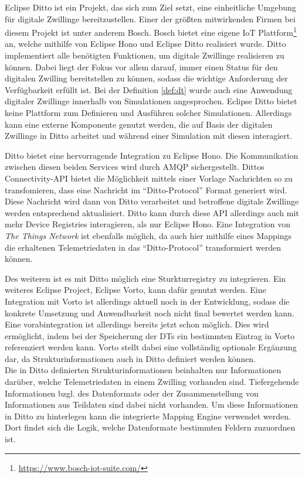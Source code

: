 Eclipse Ditto ist ein Projekt, das sich zum Ziel setzt, eine einheitliche Umgebung für digitale Zwillinge bereitzustellen. Einer der größten mitwirkenden Firmen bei diesem Projekt ist unter anderem Bosch. Bosch bietet eine eigene IoT Plattform\footnote{\url{https://www.bosch-iot-suite.com/}} an, welche mithilfe von Eclipse Hono und Eclipse Ditto realisiert wurde. Ditto implementiert alle benötigten Funktionen, um digitale Zwillinge realisieren zu können. Dabei liegt der Fokus vor allem darauf, immer einen Status für den digitalen Zwilling bereitstellen zu können, sodass die wichtige Anforderung der Verfügbarkeit erfüllt ist. Bei der Definition \vref{def:dt} wurde auch eine Anwendung digitaler Zwillinge innerhalb von Simulationen angesprochen. Eclipse Ditto bietet keine Plattform zum Definieren und Ausführen solcher Simulationen. Allerdings kann eine externe Komponente genutzt werden, die auf Basis der digitalen Zwillinge in Ditto arbeitet und während einer Simulation mit diesen interagiert.

Ditto bietet eine hervorragende Integration zu Eclipse Hono. Die Kommunikation zwischen diesen beiden Services wird durch \ac{AMQP} sichergestellt. Dittos Connectivity-API bietet die Möglichkeit mittels einer Vorlage Nachrichten so zu transfomieren, dass eine Nachricht im \enquote{Ditto-Protocol} Format generiert wird. Diese Nachricht wird dann von Ditto verarbeitet und betroffene digitale Zwillinge werden entsprechend aktualisiert. Ditto kann durch diese API allerdings auch mit mehr Device Registries interagieren, als nur Eclipse Hono. Eine Integration von \textit{The Things Network} ist ebenfalls möglich, da auch hier mithilfe eines Mappings die erhaltenen Telemetriedaten in das \enquote{Ditto-Protocol} transformiert werden können.

Des weiteren ist es mit Ditto möglich eine Sturkturregistry zu integrieren. Ein weiteres Eclipse Project, Eclipse Vorto, kann dafür genutzt werden. Eine Integration mit Vorto ist allerdings aktuell noch in der Entwicklung, sodass die konkrete Umsetzung und Anwendbarkeit noch nicht final bewertet werden kann. Eine vorabintegration ist allerdings bereits jetzt schon möglich. Dies wird ermöglicht, indem bei der Speicherung der \ac{DT}s ein bestimmten Eintrag in Vorto referenziert werden kann. Vorto stellt dabei eine vollständig optionale Ergänzung dar, da Strukturinformationen auch in Ditto definiert werden können.\\
Die in Ditto definierten Strukturinformationen beinhalten nur Informationen darüber, welche Telemetriedaten in einem Zwilling vorhanden sind. Tiefergehende Informationen bzgl. des Datenformats oder der Zusammenstellung von Informationen aus Teildaten sind dabei nicht vorhanden. Um diese Informationen in Ditto zu hinterlegen kann die integrierte Mapping Engine verwendet werden. Dort findet sich die Logik, welche Datenformate bestimmten Feldern zuzuordnen ist.

